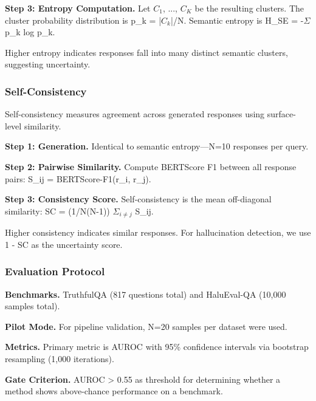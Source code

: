 \textbf{Step 3: Entropy Computation.} Let {$C_1$, ..., $C_K$} be the resulting clusters. The cluster probability distribution is p\_k = |$C_k$|/N. Semantic entropy is H\_SE = -$\Sigma$ p\_k log p\_k.

Higher entropy indicates responses fall into many distinct semantic clusters, suggesting uncertainty.

\subsubsection{Self-Consistency}

Self-consistency measures agreement across generated responses using surface-level similarity.

\textbf{Step 1: Generation.} Identical to semantic entropy---N=10 responses per query.

\textbf{Step 2: Pairwise Similarity.} Compute BERTScore F1 between all response pairs: S\_ij = BERTScore-F1(r\_i, r\_j).

\textbf{Step 3: Consistency Score.} Self-consistency is the mean off-diagonal similarity: SC = (1/N(N-1)) $\Sigma _{i\neq j}$ S\_ij.

Higher consistency indicates similar responses. For hallucination detection, we use 1 - SC as the uncertainty score.

\subsubsection{Evaluation Protocol}

\textbf{Benchmarks.} TruthfulQA (817 questions total) and HaluEval-QA (10,000 samples total).

\textbf{Pilot Mode.} For pipeline validation, N=20 samples per dataset were used.

\textbf{Metrics.} Primary metric is AUROC with 95\% confidence intervals via bootstrap resampling (1,000 iterations).

\textbf{Gate Criterion.} AUROC > 0.55 as threshold for determining whether a method shows above-chance performance on a benchmark.
